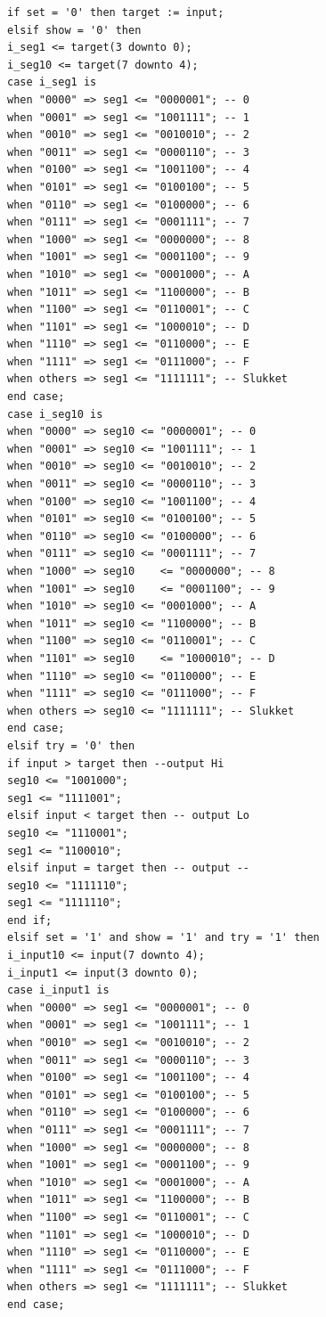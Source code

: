 \begin{enumerate}
\begin{lstlisting}[caption={Behavioral style kode for Guessgame},label={lst:Guessgame}]
if set = '0' then target := input;
elsif show = '0' then 
i_seg1 <= target(3 downto 0);
i_seg10 <= target(7 downto 4);
case i_seg1 is
when "0000" => seg1 <= "0000001"; -- 0
when "0001" => seg1 <= "1001111"; -- 1
when "0010" => seg1 <= "0010010"; -- 2
when "0011" => seg1 <= "0000110"; -- 3
when "0100" => seg1 <= "1001100"; -- 4
when "0101" => seg1 <= "0100100"; -- 5
when "0110" => seg1 <= "0100000"; -- 6
when "0111" => seg1 <= "0001111"; -- 7
when "1000" => seg1 <= "0000000"; -- 8
when "1001" => seg1 <= "0001100"; -- 9
when "1010" => seg1 <= "0001000"; -- A
when "1011" => seg1 <= "1100000"; -- B
when "1100" => seg1 <= "0110001"; -- C
when "1101" => seg1 <= "1000010"; -- D
when "1110" => seg1 <= "0110000"; -- E
when "1111" => seg1 <= "0111000"; -- F
when others => seg1 <= "1111111"; -- Slukket
end case;
case i_seg10 is
when "0000" => seg10 <= "0000001"; -- 0
when "0001" => seg10 <= "1001111"; -- 1
when "0010" => seg10 <= "0010010"; -- 2
when "0011" => seg10 <= "0000110"; -- 3
when "0100" => seg10 <= "1001100"; -- 4
when "0101" => seg10 <= "0100100"; -- 5
when "0110" => seg10 <= "0100000"; -- 6
when "0111" => seg10 <= "0001111"; -- 7
when "1000" => seg10	<= "0000000"; -- 8
when "1001" => seg10	<= "0001100"; -- 9
when "1010" => seg10 <= "0001000"; -- A
when "1011" => seg10 <= "1100000"; -- B
when "1100" => seg10 <= "0110001"; -- C
when "1101" => seg10	<= "1000010"; -- D
when "1110" => seg10 <= "0110000"; -- E
when "1111" => seg10 <= "0111000"; -- F
when others => seg10 <= "1111111"; -- Slukket
end case;
elsif try = '0' then 
if input > target then --output Hi
seg10 <= "1001000"; 
seg1 <= "1111001";
elsif input < target then -- output Lo
seg10 <= "1110001"; 
seg1 <= "1100010";
elsif input = target then -- output --
seg10 <= "1111110"; 
seg1 <= "1111110";
end if;
elsif set = '1' and show = '1' and try = '1' then 
i_input10 <= input(7 downto 4); 
i_input1 <= input(3 downto 0);
case i_input1 is
when "0000" => seg1 <= "0000001"; -- 0
when "0001" => seg1 <= "1001111"; -- 1
when "0010" => seg1 <= "0010010"; -- 2
when "0011" => seg1 <= "0000110"; -- 3
when "0100" => seg1 <= "1001100"; -- 4
when "0101" => seg1 <= "0100100"; -- 5
when "0110" => seg1 <= "0100000"; -- 6
when "0111" => seg1 <= "0001111"; -- 7
when "1000" => seg1 <= "0000000"; -- 8
when "1001" => seg1 <= "0001100"; -- 9
when "1010" => seg1 <= "0001000"; -- A
when "1011" => seg1 <= "1100000"; -- B
when "1100" => seg1 <= "0110001"; -- C
when "1101" => seg1 <= "1000010"; -- D
when "1110" => seg1 <= "0110000"; -- E
when "1111" => seg1 <= "0111000"; -- F
when others => seg1 <= "1111111"; -- Slukket
end case;


\end{lstlisting}
\end{enumerate}
